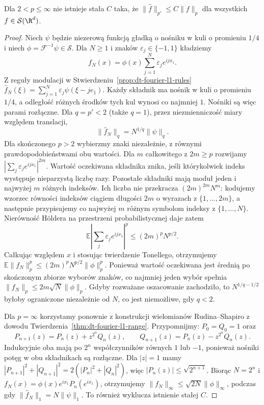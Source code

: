 \begin{stwierdzenie}
\label{prop:dt-hy-fails}
Dla $2<p\le\infty$ nie istnieje stała $C$ taka, że
$\|\widehat f\|_{p'}\le C\|f\|_p$ dla wszystkich
$f\in\mathcal S(\R^d)$.
\end{stwierdzenie}
\begin{proof}
Niech $\psi$ będzie niezerową funkcją gładką
o nośniku w kuli o promieniu $1/4$ i niech
$\phi=\mathcal F^{-1}\psi\in\mathcal S$.
Dla $N\ge1$ i znaków $\varepsilon_j\in\{-1,1\}$
kładziemy
\[
 f_N(x)=\phi(x)\sum_{j=1}^N\varepsilon_j e^{ijx_1}.
\]
Z reguły modulacji w
Stwierdzeniu~\ref{prop:dt-fourier-l1-rules}
$\widehat f_N(\xi)=\sum_{j=1}^N\varepsilon_j\psi(\xi-je_1)$.
Każdy składnik ma nośnik w kuli o promieniu $1/4$,
a odległość różnych środków tych kul wynosi co najmniej
$1$. Nośniki są więc parami rozłączne. Dla $q=p'<2$
(także $q=1$), przez niezmienniczość miary względem
translacji,
\[
 \|\widehat f_N\|_q=N^{1/q}\|\psi\|_q.
\]
Dla skończonego $p>2$ wybierzmy znaki niezależnie,
z równymi prawdopodobieństwami obu wartości.
Dla $m$ całkowitego z $2m\ge p$ rozwijamy
$\left|\sum_j\varepsilon_j e^{ijx_1}\right|^{2m}$.
Wartość oczekiwana składnika znika, jeśli którykolwiek
indeks występuje nieparzystą liczbę razy. Pozostałe
składniki mają moduł jeden i najwyżej $m$ różnych
indeksów. Ich liczba nie przekracza
$(2m)^{2m}N^m$: kodujemy wzorzec równości indeksów
ciągiem długości $2m$ o wyrazach z $\{1,\ldots,2m\}$,
a następnie przypisujemy co najwyżej $m$ różnym
symbolom indeksy z $\{1,\ldots,N\}$.
Nierówność Höldera na przestrzeni probabilistycznej daje
zatem
\[
 \mathbb E\left|\sum_j\varepsilon_j e^{ijx_1}\right|^p
 \le (2m)^p N^{p/2}.
\]
Całkując względem $x$ i stosując twierdzenie Tonellego,
otrzymujemy
$\mathbb E\|f_N\|_p^p\le (2m)^pN^{p/2}\|\phi\|_p^p$.
Ponieważ wartość oczekiwana jest średnią po skończonym
zbiorze wyborów znaków, co najmniej jeden wybór
spełnia $\|f_N\|_p\le 2m\sqrt N\|\phi\|_p$.
Gdyby rozważane oszacowanie zachodziło, to
$N^{1/q-1/2}$ byłoby ograniczone niezależnie od $N$,
co jest niemożliwe, gdy $q<2$.

Dla $p=\infty$ korzystamy ponownie z konstrukcji
wielomianów Rudina--Shapiro z dowodu
Twierdzenia~\ref{thm:dt-fourier-l1-range}. Przypomnijmy:
$P_0=Q_0=1$ oraz
\[
 P_{n+1}(z)=P_n(z)+z^{2^n}Q_n(z),\qquad
 Q_{n+1}(z)=P_n(z)-z^{2^n}Q_n(z).
\]
Indukcyjnie oba mają po $2^n$ współczynników
równych $1$ lub $-1$, ponieważ nośniki potęg
w obu składnikach są rozłączne. Dla $|z|=1$ mamy
$|P_{n+1}|^2+|Q_{n+1}|^2=2(|P_n|^2+|Q_n|^2)$,
więc $|P_n(z)|\le\sqrt{2^{n+1}}$.
Biorąc $N=2^n$ i $f_N(x)=\phi(x)e^{ix_1}P_n(e^{ix_1})$,
otrzymujemy $\|f_N\|_\infty\le\sqrt{2N}\|\phi\|_\infty$,
podczas gdy $\|\widehat f_N\|_1=N\|\psi\|_1$.
To również wyklucza istnienie stałej $C$.
\end{proof}

